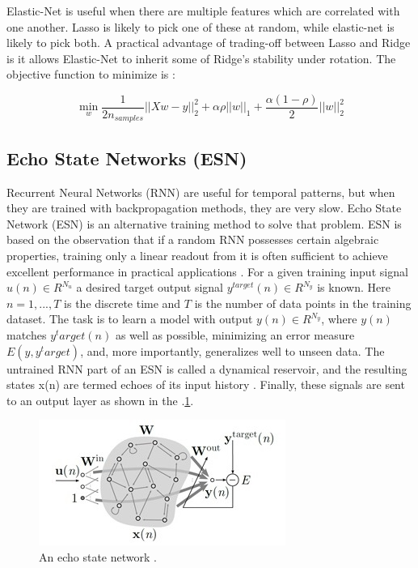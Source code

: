 \documentclass[review,authoryear,english]{elsarticle}
\begin{document}
Elastic-Net is useful when there are multiple features which are correlated with one another. Lasso is likely to pick one of these at random, while elastic-net is likely to pick both.
A practical advantage of trading-off between Lasso and Ridge is it allows Elastic-Net to inherit some of Ridge’s stability under rotation. The objective function to minimize is \citep{scikitlearn2011}:

$$\min_{w} { \frac{1}{2n_{samples}} \Bigr| \Bigr| Xw - y \Bigr| \Bigr|_2^2  + \alpha \rho \Bigr| \Bigr| w \Bigr| \Bigr|_1 + \frac{\alpha (1- \rho)}{2} \Bigr| \Bigr| w \Bigr| \Bigr|_2^2 } $$

\subsection{Echo State Networks (ESN)}
Recurrent Neural Networks (RNN) are useful for temporal patterns, but when they are trained with backpropagation methods, they are very slow.  Echo State Network (ESN) is an alternative training method to solve that problem.  ESN is based on the observation that if a random RNN possesses certain algebraic properties, training only a linear readout from it is often sufficient to achieve excellent performance in practical applications \citep{Lukose2009}. 
For a given training input signal $u(n)  \in R^{N_u}$ a desired target output signal $y^{target}(n) \in R^{N_y}$
is known. Here $n = 1, . . . ,T$ is the discrete time and $T$ is the number of data points in the training dataset. The task is to learn a model with output $y(n) \in R^{N_y}$, where $y(n)$ matches $y^target(n)$ as well as possible, minimizing an error measure $E(y,y^target)$, and, more importantly, generalizes well to unseen data. The untrained RNN part of an ESN is called a dynamical reservoir, and the resulting states x(n) are termed echoes of its input history \citep{Lukose2012}. Finally, these signals are sent to an output layer as shown in the \figurename
$.$\ref{figura3}.
\begin{figure}[h] 
 \centering
 \includegraphics[scale=.9]{Reservorio}
 \caption{An echo state network \citep{Lukose2012}.} 
 \label{figura3} 
\end{figure}
 
\end{document}
